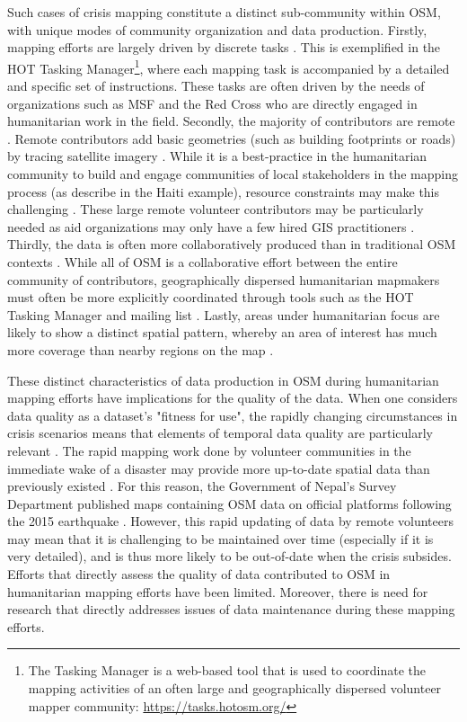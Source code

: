 Such cases of crisis mapping constitute a distinct sub-community within OSM, with unique modes of community organization and data production. Firstly, mapping efforts are largely driven by discrete tasks \parencite{vyncke_personal_2020}. This is exemplified in the HOT Tasking Manager\footnote{The Tasking Manager is a web-based tool that is used to coordinate the mapping activities of an often large and geographically dispersed volunteer mapper community: \url{https://tasks.hotosm.org/}}, where each mapping task is accompanied by a detailed and specific set of instructions. These tasks are often driven by the needs of organizations such as MSF and the Red Cross who are directly engaged in humanitarian work in the field. Secondly, the majority of contributors are remote \parencite{eckle_quality_2015, vyncke_personal_2020}. Remote contributors add basic geometries (such as building footprints or roads) by tracing satellite imagery \parencite{vyncke_humanitarian_2015}. While it is a best-practice in the humanitarian community to build and engage communities of local stakeholders in the mapping process (as \textcite{soden_crowdsourced_2014} describe in the Haiti example), resource constraints may make this challenging \parencite{vyncke_personal_2020}. These large remote volunteer contributors may be particularly needed as aid organizations may only have a few hired GIS practitioners \parencite[p. 2798]{soden_infrastructure_2016}. Thirdly, the data is often more collaboratively produced than in traditional OSM contexts \parencite{poiani_potential_2016, vyncke_personal_2020}. While all of OSM is a collaborative effort between the entire community of contributors, geographically dispersed humanitarian mapmakers must often be more explicitly coordinated through tools such as the HOT Tasking Manager and mailing list \parencite{palen_success_2015}. Lastly, areas under humanitarian focus are likely to show a distinct spatial pattern, whereby an area of interest has much more coverage than nearby regions on the map \parencite{anderson_crowd_2018}. 

These distinct characteristics of data production in OSM during humanitarian mapping efforts have implications for the quality of the data. When one considers data quality as a dataset’s "fitness for use", the rapidly changing circumstances in crisis scenarios means that elements of temporal data quality are particularly relevant \parencite{chen_coordination_2008}. The rapid mapping work done by volunteer communities in the immediate wake of a disaster may provide more up-to-date spatial data than previously existed \parencite{soden_crowdsourced_2014}. For this reason, the Government of Nepal’s Survey Department published maps containing OSM data on official platforms following the 2015 earthquake \parencite{soden_infrastructure_2016}. However, this rapid updating of data by remote volunteers may mean that it is challenging to be maintained over time (especially if it is very detailed), and is thus more likely to be out-of-date when the crisis subsides. Efforts that directly assess the quality of data contributed to OSM in humanitarian mapping efforts have been limited. Moreover, there is need for research that directly addresses issues of data maintenance during these mapping efforts. 

